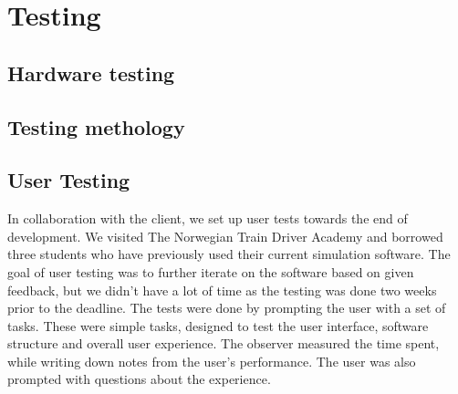 \section{Testing}

\subsection{Hardware testing}

\subsection{Testing methology}

\subsection{User Testing}

In collaboration with the client, we set up user tests towards the end of development. We visited The Norwegian Train Driver Academy and borrowed three students who have previously used their current simulation software. The goal of user testing was to further iterate on the software based on given feedback, but we didn't have a lot of time as the testing was done two weeks prior to the deadline. The tests were done by prompting the user with a set of tasks. These were simple tasks, designed to test the user interface, software structure and overall user experience.  The observer measured the time spent, while writing down notes from the user’s performance. The user was also prompted with questions about the experience. \newline

